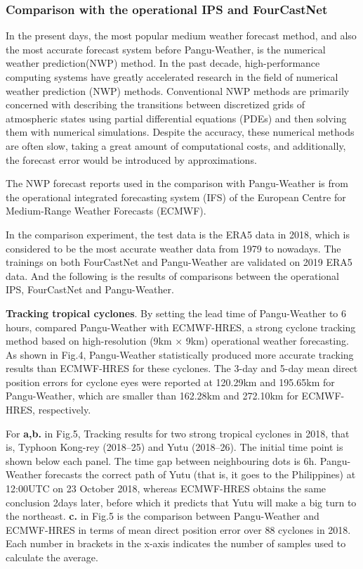 \documentclass[conference]{IEEEtran}
\begin{document}
\subsubsection{Comparison with the operational IPS and FourCastNet}
In the present days, the most popular medium weather forecast method, and also the most accurate forecast system before Pangu-Weather, is the numerical weather prediction(NWP) method. In the past decade, high-performance computing systems have greatly accelerated research in the field of numerical weather prediction (NWP) methods\cite{b19}. Conventional NWP methods are primarily concerned with describing the transitions between discretized grids of atmospheric states using partial differential equations (PDEs) and then solving them with numerical simulations\cite{b20,b21,b22}. Despite the accuracy, these numerical methods are often slow, taking a great amount of computational costs, and additionally, the forecast error would be introduced by approximations.

The NWP forecast reports used in the comparison with Pangu-Weather is from  the operational integrated forecasting system (IFS) of the European Centre for Medium-Range Weather Forecasts (ECMWF)\cite{b23}.

In the comparison experiment, the test data is the ERA5 data\cite{b24} in 2018, which is considered to be the most accurate weather data from 1979 to nowadays. The trainings on both FourCastNet and Pangu-Weather are validated on 2019 ERA5 data. And the following is the results of comparisons between the operational IPS, FourCastNet and Pangu-Weather.

\textbf{Tracking tropical cyclones}. By setting the lead time of Pangu-Weather to 6 hours, \cite{b15} compared Pangu-Weather with ECMWF-HRES, a strong cyclone tracking method based on high-resolution (9km × 9km) operational weather forecasting. As shown in Fig.4, Pangu-Weather statistically produced more accurate tracking results than ECMWF-HRES for these cyclones. The 3-day and 5-day mean direct position errors for cyclone eyes were reported at 120.29km and 195.65km for Pangu-Weather, which are smaller than 162.28km and 272.10km for ECMWF-HRES, respectively.

For \textbf{a,b.} in Fig.5, Tracking results for two strong tropical cyclones in 2018, that is, Typhoon Kong-rey (2018–25) and Yutu (2018–26). The initial time point is shown below each panel. The time gap between neighbouring dots is 6h. Pangu-Weather forecasts the correct path of Yutu (that is, it goes to the Philippines) at 12:00UTC on 23 October 2018, whereas ECMWF-HRES obtains the same conclusion 2days later, before which it predicts that Yutu will make a big turn to the northeast. \textbf{c.} in Fig.5 is the comparison between Pangu-Weather and ECMWF-HRES in terms of mean direct position error over 88 cyclones in 2018. Each number in brackets in the x-axis indicates the number of samples used to calculate the average. 
\end{document}

